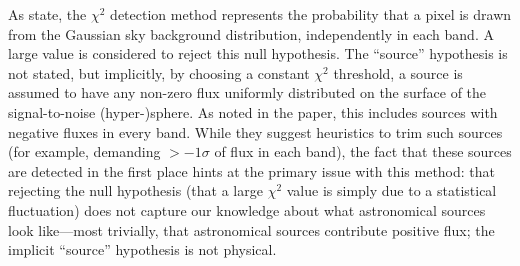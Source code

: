 \documentclass[11pt,letterpaper,linenumbers]{aastex7}
\begin{document}

As \cite{szalay1999} state, the $\chi^2$ detection method represents
the probability that a pixel is drawn from the Gaussian sky background
distribution, independently in each band.  A large value is
considered to reject this null hypothesis.  The ``source'' hypothesis
is not stated, but implicitly, by choosing a constant $\chi^2$
threshold, a source is assumed to have any non-zero flux uniformly
distributed on the surface of the signal-to-noise (hyper-)sphere.  As
noted in the paper, this includes sources with negative fluxes in
every band.  While they suggest heuristics to trim such sources (for
example, demanding $> -1 \sigma$ of flux in each band), the fact that
these sources are detected in the first place hints at the primary
issue with this method: that rejecting the null hypothesis (that a
large $\chi^2$ value is simply due to a statistical fluctuation) does
not capture our knowledge about what astronomical sources look
like---most trivially, that astronomical sources contribute positive
flux; the implicit ``source'' hypothesis is not physical.
\end{document}
